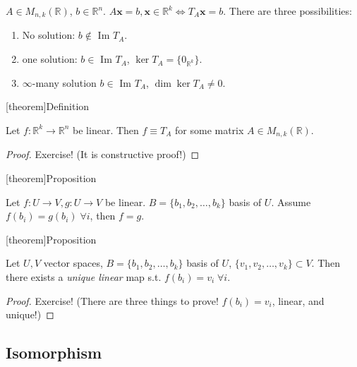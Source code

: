 \documentclass[12pt]{report}
\theoremstyle{definition}
\begin{document}
\begin{ex}
    $A \in M_{n,k}(\mathbb{R})$, $b \in \mathbb{R}^{n}$.
    $A\pmb{x} = b, \pmb{x} \in \mathbb{R}^{k} \iff T_A \pmb{x} = b$.
    There are three possibilities:
    \begin{enumerate}[label = (\arabic*)]
        \item No solution: $b \notin $ Im $T_A$.
        \item one solution: $b \in$ Im $T_A$, $\ker{T_A} = \{0_{\mathbb{R}^{k}}\}$.
        \item $\infty$-many solution $b \in$ Im $T_A$, $\dim{\ker{T_A}} \neq 0$.
    \end{enumerate}
\end{ex}

[theorem]{Definition}
\begin{linear map has a matrix representation}
    Let $f:\mathbb{R}^{k} \rightarrow{} \mathbb{R}^{n}$ be linear.
    Then $f \equiv T_A$ for some matrix $A \in M_{n,k}(\mathbb{R})$.
\end{linear map has a matrix representation}

\begin{proof}
   Exercise! (It is constructive proof!)
\end{proof}

[theorem]{Proposition}
\begin{same basis tranformed implies same linear map}
    Let $f:U\rightarrow{}V, g:U\rightarrow{}V$ be linear.
    $B = \{b_1, b_2,\ldots,b_k\}$ basis of $U$.
    Assume $f(b_i) = g(b_i) \;\forall i$, then $f = g$.
\end{same basis tranformed implies same linear map}

[theorem]{Proposition}
\begin{sdfsdf}
    Let $U,V$ vector spaces, $B = \{b_1, b_2,\ldots,b_k\}$ basis of $U$,
    $\{v_1, v_2,\ldots,v_k\} \subset V$.
    Then there exists a \emph{unique linear} map s.t. $f(b_i) = v_i \;\forall i$.
\end{sdfsdf}

\begin{proof}
    Exercise! (There are three things to prove! $f(b_i) = v_i$, linear, and unique!)
\end{proof}

\subsection{Isomorphism}
\end{document}
